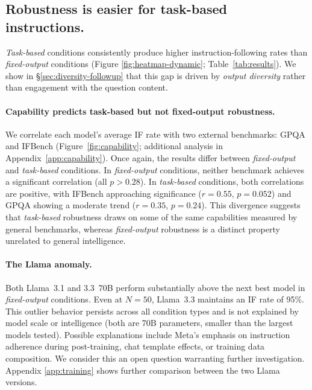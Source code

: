 \subsection{Robustness is easier for task-based instructions.}
\label{sec:diversity}

\emph{Task-based} conditions consistently produce higher instruction-following rates than \emph{fixed-output} conditions (Figure \ref{fig:heatmap-dynamic}; Table~\ref{tab:results}). We show in \S\ref{sec:diversity-followup} that this gap is driven by \emph{output diversity} rather than engagement with the question content.

\paragraph{Capability predicts task-based but not fixed-output robustness.}
We correlate each model's average IF rate with two external benchmarks: GPQA \citep{rein_gpqa_2023} and IFBench \citep{pyatkin_generalizing_2025} (Figure~\ref{fig:capability}; additional analysis in Appendix~\ref{app:capability}). Once again, the results differ between \emph{fixed-output} and \emph{task-based} conditions. In \emph{fixed-output} conditions, neither benchmark achieves a significant correlation (all $p > 0.28$). In \emph{task-based} conditions, both correlations are positive, with IFBench approaching significance ($r{=}0.55$, $p{=}0.052$) and GPQA showing a moderate trend ($r{=}0.35$, $p{=}0.24$). This divergence suggests that \emph{task-based} robustness draws on some of the same capabilities measured by general benchmarks, whereas \emph{fixed-output} robustness is a distinct property unrelated to general intelligence.


% 

\paragraph{The Llama anomaly.}
Both Llama~3.1 and 3.3~70B perform substantially above the next best model in \emph{fixed-output} conditions. Even at $N{=}50$, Llama~3.3 maintains an IF rate of 95\%. This outlier behavior persists across all condition types and is not explained by model scale or intelligence (both are 70B parameters, smaller than the largest models tested). Possible explanations include Meta's emphasis on instruction adherence during post-training, chat template effects, or training data composition. We consider this an open question warranting further investigation. Appendix \ref{app:training} shows further comparison between the two Llama versions.


